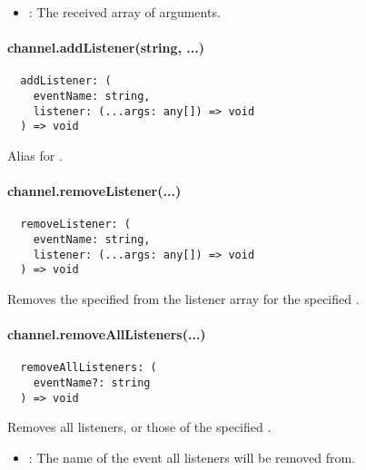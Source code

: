 \begin{itemize}
  \setlength\itemsep{-0.8em}
  \item {}: The received array of arguments.
\end{itemize}


\paragraph{channel.addListener(string, ...)}

\begin{verbatim}
  addListener: (
    eventName: string,
    listener: (...args: any[]) => void
  ) => void
\end{verbatim}

Alias for .


\paragraph{channel.removeListener(...)}

\begin{verbatim}
  removeListener: (
    eventName: string,
    listener: (...args: any[]) => void
  ) => void
\end{verbatim}

Removes the specified  from the listener array for the specified .


\paragraph{channel.removeAllListeners(...)}

\begin{verbatim}
  removeAllListeners: (
    eventName?: string
  ) => void
\end{verbatim}

Removes all listeners, or those of the specified .

\begin{itemize}
  \setlength\itemsep{-0.8em}
  \item {}: The name of the event all listeners will be removed from.
\end{itemize}

